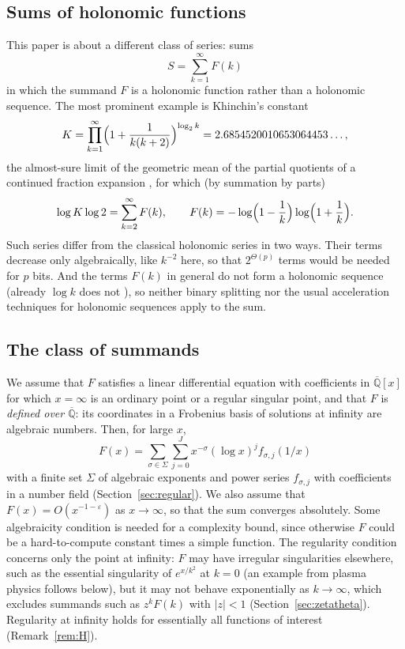\documentclass[11pt]{amsart}
\theoremstyle{definition}
\theoremstyle{remark}
\newcommand{\Qbar}{\overline{\mathbb{Q}}}
\begin{document}
\subsection{Sums of holonomic functions}
This paper is about a different class of series: sums
\[
  S = \sum_{k=1}^{\infty} F(k)
\]
in which the summand $F$ is a holonomic function rather than a holonomic sequence. The most prominent
example is Khinchin's constant
\[
  K = \prod_{k=1}^{\infty} \Bigl(1 + \frac{1}{k(k+2)}\Bigr)^{\log_2 k} = 2.6854520010653064453\ldots,
\]
the almost-sure limit of the geometric mean of the partial quotients of a continued fraction
expansion \cite{Khi35}, for which (by summation by parts)
\begin{equation}\label{eq:logK}
  \log K \log 2 = \sum_{k=2}^{\infty} F(k), \qquad F(k) = -\log\Bigl(1-\frac1k\Bigr)\log\Bigl(1+\frac1k\Bigr).
\end{equation}
Such series differ from the classical holonomic series in two ways. Their terms decrease only algebraically,
like $k^{-2}$ here, so that $2^{\Theta(p)}$ terms would be needed for $p$ bits. And the terms $F(k)$ in general do
not form a holonomic sequence (already $\log k$ does not \cite{FGS05}), so neither binary splitting nor the usual
acceleration techniques for holonomic sequences apply to the sum.

\subsection{The class of summands}
We assume that $F$ satisfies a linear differential equation with coefficients in $\Qbar[x]$ for which
$x = \infty$ is an ordinary point or a regular singular point, and that $F$ is \emph{defined over $\Qbar$}: its
coordinates in a Frobenius basis of solutions at infinity are algebraic numbers. Then, for large $x$,
\begin{equation}\label{eq:frob}
  F(x) = \sum_{\sigma \in \Sigma}\sum_{j=0}^{J} x^{-\sigma}(\log x)^j f_{\sigma,j}(1/x)
\end{equation}
with a finite set $\Sigma$ of algebraic exponents and power series $f_{\sigma,j}$ with coefficients in a number
field (Section~\ref{sec:regular}). We also assume that $F(x) = O(x^{-1-\varepsilon})$ as $x \to \infty$, so that
the sum converges absolutely. Some algebraicity condition is needed for a complexity bound, since otherwise
$F$ could be a hard-to-compute constant times a simple function. The regularity condition concerns only the point
at infinity: $F$ may have irregular singularities elsewhere, such as the essential singularity of
$e^{x/k^2}$ at $k = 0$ (an example from plasma physics follows below), but it may not behave exponentially as
$k \to \infty$, which excludes summands such as $z^kF(k)$ with $|z| < 1$ (Section~\ref{sec:zetatheta}).
Regularity at infinity holds for essentially all functions of interest (Remark~\ref{rem:H}).
\end{document}
